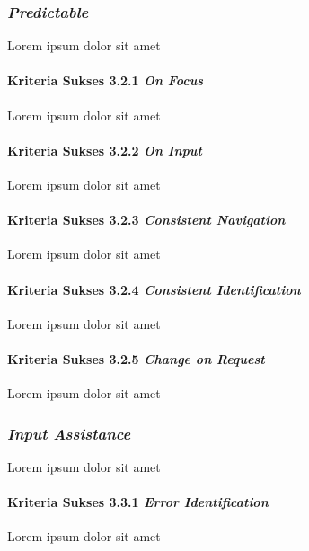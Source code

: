 \subsubsection{\textit{Predictable}}
\label{sec:predictable}
Lorem ipsum dolor sit amet

\paragraph{Kriteria Sukses 3.2.1 \textit{On Focus}}
\label{sec:kriteria_sukses_3.2.1}
Lorem ipsum dolor sit amet

\paragraph{Kriteria Sukses 3.2.2 \textit{On Input}}
\label{sec:kriteria_sukses_3.2.2}
Lorem ipsum dolor sit amet

\paragraph{Kriteria Sukses 3.2.3 \textit{Consistent Navigation}}
\label{sec:kriteria_sukses_3.2.3}
Lorem ipsum dolor sit amet

\paragraph{Kriteria Sukses 3.2.4 \textit{Consistent Identification}}
\label{sec:kriteria_sukses_3.2.4}
Lorem ipsum dolor sit amet

\paragraph{Kriteria Sukses 3.2.5 \textit{Change on Request}}
\label{sec:kriteria_sukses_3.2.5}
Lorem ipsum dolor sit amet

\subsubsection{\textit{Input Assistance}}
\label{sec:input_assistance}
Lorem ipsum dolor sit amet

\paragraph{Kriteria Sukses 3.3.1 \textit{Error Identification}}
\label{sec:kriteria_sukses_3.3.1}
Lorem ipsum dolor sit amet

